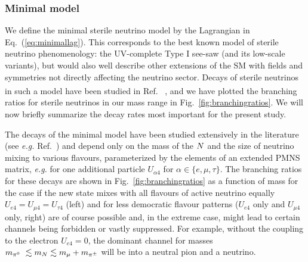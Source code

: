 \documentclass[11pt, a4paper]{article}
\newcommand{\refeq}[1]{Eq.~(\ref{#1})}
\newcommand{\reffig}[1]{Fig.~\ref{#1}}
\newcommand{\refref}[1]{Ref.~\cite{#1}}
\def\ster{\ensuremath N}
\newcounter{CommentCount}
\newcommand{\marcom}[2]{\textsuperscript{\textcolor{#1}{\theCommentCount}}\marginpar{\textsuperscript{\textcolor{#1}{\theCommentCount}}\textcolor{#1}{{\small#1: #2}}}\stepcounter{CommentCount}}
\begin{document}
\subsubsection{\label{sec:minimal}Minimal model}

We define the minimal sterile neutrino model by the Lagrangian in
\refeq{eq:minimallag}. This corresponds to the best known model of sterile
neutrino phenomenology: the UV-complete Type I see-saw (and its low-scale
variants), but would also well describe other extensions of the SM with fields
and symmetries not directly affecting the neutrino sector. Decays of sterile
neutrinos in such a model have been studied in \refref{Atre:2009rg}
\marcom{PB}{Others?}, and we have plotted the branching ratios for sterile
neutrinos in our mass range in \reffig{fig:branchingratios}. We will now
briefly summarize the decay rates most important for the present study.


The decays of the minimal model have been studied extensively in the literature
(see \emph{e.g.} \refref{Atre:2009rg}) and depend only on the mass of the
$\ster$ and the size of neutrino mixing to various flavours, parameterized by
the elements of an extended PMNS matrix, \emph{e.g.} for one additional
particle 
%
$U_{\alpha 4}$ for $\alpha \in \{e,\mu,\tau\}$. 
%
The branching ratios for these decays are shown in \reffig{fig:branchingratios}
as a function of mass for the case if the new state mixes with all flavours of
active neutrino equally $U_{e4}=U_{\mu 4}=U_{\tau 4}$ (left) and for less
democratic flavour patterns ($U_{e4}$ only and $U_{\mu 4}$ only, right) are of
course possible and, in the extreme case, might lead to certain channels being
forbidden or vastly suppressed. For example, without the coupling to the
electron $U_{e4}=0$, the dominant channel for masses $m_{\pi^0}~\lesssim
m_\ster \lesssim m_{\mu}+m_{\pi^\pm}$ will be into a neutral pion and a
neutrino.
\end{document}
